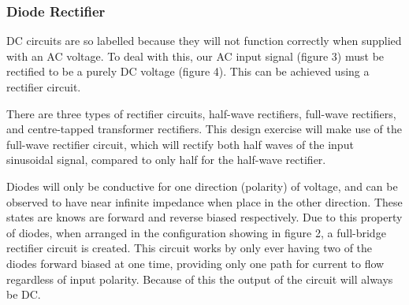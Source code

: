 \documentclass[a4paper,11pt]{article}
\begin{document}
\subsubsection{Diode Rectifier}
DC circuits are so labelled because they will not function correctly when supplied with an AC voltage. To deal with this, our AC input signal (figure 3) must be rectified to be a purely DC voltage (figure 4). This can be achieved using a rectifier circuit. 

There are three types of rectifier circuits, half-wave rectifiers, full-wave rectifiers, and centre-tapped transformer rectifiers. This design exercise will make use of the full-wave rectifier circuit, which will rectify both half waves of the input sinusoidal signal, compared to only half for the half-wave rectifier.

Diodes will only be conductive for one direction (polarity) of voltage, and can be observed to have near infinite impedance when place in the other direction. These states are knows are forward and reverse biased respectively. Due to this property of diodes, when arranged in the configuration showing in figure 2, a full-bridge rectifier circuit is created. This circuit works by only ever having two of the diodes forward biased at one time, providing only one path for current to flow regardless of input polarity. Because of this the output of the circuit will always be DC.
\end{document}
